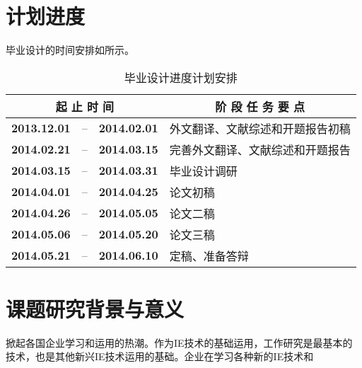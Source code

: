 \chapter{计划进度}
毕业设计的时间安排如所示。

\begin{table}[H]
  \centering
  \caption{毕业设计进度计划安排}
    \begin{tabular}{cccl}
    \toprule
    \multicolumn{3}{c}{\textbf{起 止 时 间}} & \multicolumn{1}{c}{\textbf{阶  段  任  务  要  点}} \\
    \midrule
    \textbf{2013.12.01} & --    & \textbf{2014.02.01} & 外文翻译、文献综述和开题报告初稿 \\
    \textbf{2014.02.21} & --    & \textbf{2014.03.15} & 完善外文翻译、文献综述和开题报告 \\
    \textbf{2014.03.15} & --    & \textbf{2014.03.31} & 毕业设计调研 \\
    \textbf{2014.04.01} & --    & \textbf{2014.04.25} & 论文初稿 \\
    \textbf{2014.04.26} & --    & \textbf{2014.05.05} & 论文二稿 \\
    \textbf{2014.05.06} & --    & \textbf{2014.05.20} & 论文三稿 \\
    \textbf{2014.05.21} & --    & \textbf{2014.06.10} & 定稿、准备答辩 \\
    \bottomrule
    \end{tabular}%
  \label{tab:myschedule}%
\end{table}%


\chapter{课题研究背景与意义}
掀起各国企业学习和运用的热潮。作为IE技术的基础运用，工作研究是最基本的技术，也是其他新兴IE技术运用的基础。企业在学习各种新的IE技术和\cite{2007}